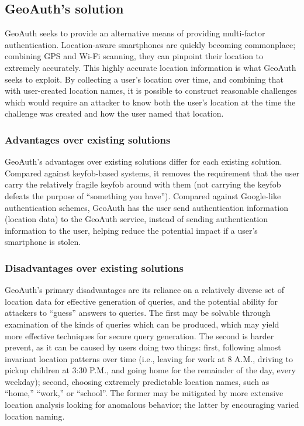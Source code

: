 \documentclass[11pt]{article} %
\begin{document}
\subsection{GeoAuth's solution}
GeoAuth seeks to provide an alternative means of providing multi-factor authentication. Location-aware smartphones are quickly becoming commonplace; combining GPS and Wi-Fi scanning, they can pinpoint their location to extremely accurately. This highly accurate location information is what GeoAuth seeks to exploit. By collecting a user's location over time, and combining that with user-created location names, it is possible to construct reasonable challenges which would require an attacker to know both the user's location at the time the challenge was created and how the user named that location.

\subsubsection{Advantages over existing solutions}
GeoAuth's advantages over existing solutions differ for each existing solution. Compared against keyfob-based systems, it removes the requirement that the user carry the relatively fragile keyfob around with them (not carrying the keyfob defeats the purpose of ``something you have''). Compared against Google-like authentication schemes, GeoAuth has the user send authentication information (location data) to the GeoAuth service, instead of sending authentication information to the user, helping reduce the potential impact if a user's smartphone is stolen.

\subsubsection{Disadvantages over existing solutions}
GeoAuth's primary disadvantages are its reliance on a relatively diverse set of location data for effective generation of queries, and the potential ability for attackers to ``guess'' answers to queries. The first may be solvable through examination of the kinds of queries which can be produced, which may yield more effective techniques for secure query generation. The second is harder prevent, as it can be caused by users doing two things: first, following almost invariant location patterns over time (i.e., leaving for work at 8 A.M., driving to pickup children at 3:30 P.M., and going home for the remainder of the day, every weekday); second, choosing extremely predictable location names, such as ``home,'' ``work,'' or ``school''. The former may be mitigated by more extensive location analysis looking for anomalous behavior; the latter by encouraging varied location naming.
\end{document}
